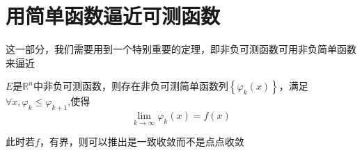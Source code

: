 \documentclass[lang=cn,14pt]{elegantbook}
\begin{document}
	\section{用简单函数逼近可测函数}
	这一部分，我们需要用到一个特别重要的定理，即非负可测函数可用非负简单函数来逼近
	\begin{theorem}
		$E$是$\mathbb{R} ^n$中非负可测函数，则存在非负可测简单函数列$\left\{ \varphi _k\left( x \right) \right\} $，满足$\forall x, \varphi _k \le \varphi _{k+1}$,使得
		\begin{equation*}
			\underset{k\rightarrow \infty}{\lim}\varphi _k\left( x \right) =f\left( x \right) 
		\end{equation*}
	\end{theorem}
	\begin{remark}
		此时若$f$，有界，则可以推出是一致收敛而不是点点收敛
	\end{remark}
\end{document}
